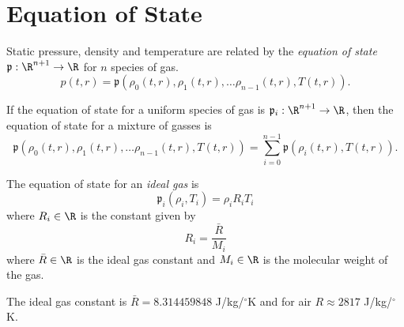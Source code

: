 \section{Equation of State}

\begin{df}
Static pressure, density and temperature are related by the
\emph{equation of state} $\mathfrak{p}:\R^{n+1}\to \R$ for $n$
species of gas.
\begin{equation}
    p(t,r) = \mathfrak{p}(\rho_0(t,r), \rho_1(t,r), \ldots \rho_{n-1}(t,r), T(t,r)).
\end{equation}
\end{df}

\begin{df}
If the equation of state for a uniform species of gas is
$\mathfrak{p}_i:\R^{n+1}\to \R$, then the equation of
state for a mixture of gasses is
\begin{equation}
    \mathfrak{p}(\rho_0(t,r), \rho_1(t,r), \ldots \rho_{n-1}(t,r), T(t,r)) =
        \sum_{i=0}^{n-1} \mathfrak{p}(\rho_i(t,r),T(t,r)).
\end{equation}
\end{df}

\begin{df}
The equation of state for an \emph{ideal gas} is
\begin{equation}
    \mathfrak{p}_i(\rho_i,T_i) = \rho_i R_i T_i
\end{equation}
where $R_i\in \R$ is the constant given by
\begin{equation}
    R_i = \frac{\bar{R}}{M_i}
\end{equation}
where $\bar{R}\in \R$ is the ideal gas constant
and $M_i\in \R$ is the molecular weight of the gas.
\end{df}
\begin{rk}
The ideal gas constant is $\bar{R}=8.314459848$ J/kg/$^\circ$K
and for air $R\approx 2817$ J/kg/$^\circ$K.
\end{rk}
